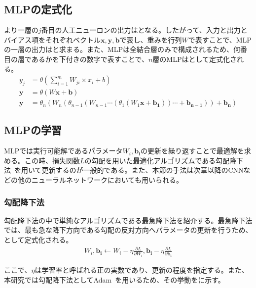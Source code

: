 \subsection{MLPの定式化}

より一層の$j$番目の人工ニューロンの出力はとなる。したがって、入力と出力とバイアス項をそれぞれベクトル$\boldsymbol{x},\boldsymbol{y},\boldsymbol{b}$で表し、重みを行列$W$で表すことで、MLPの一層の出力はと求まる。また、MLPは全結合層のみで構成されるため、何番目の層であるかを下付きの数字で表すことで、$n$層のMLPはとして定式化される。
\begin{align}
    \label{eq:MLP0_1}
    y_j&=\theta(\sum_{i=1}^{m} W_{ji} \times x_i+b)\\
    \label{eq:MLP0_2}
    \boldsymbol{y}&=\theta(W\boldsymbol{x}+\boldsymbol{b})\\[8pt]
    \label{eq:MLP0_3}
    \boldsymbol{y}&=\theta_{n}(W_{n}(\theta_{n-1}(W_{n-1}\cdots(\theta_{1}(W_{1}\boldsymbol{x}+\boldsymbol{b_{1}}))\cdots+\boldsymbol{b_{n-1}}))+\boldsymbol{b_{n}})
\end{align}

\subsection{MLPの学習}

MLPでは実行可能解であるパラメータ$W_i,\boldsymbol{b_i}$の更新を繰り返すことで最適解を求める。この時、損失関数$L$の勾配を用いた最適化アルゴリズムである勾配降下法~\cite{GradientDescent}を用いて更新するのが一般的である。また、本節の手法は次章以降のCNNなどの他のニューラルネットワークにおいても用いられる。

\subsubsection{勾配降下法}
\label{sec:grad}

勾配降下法の中で単純なアルゴリズムである最急降下法を紹介する。最急降下法では、最も急な降下方向である勾配の反対方向へパラメータの更新を行うため、として定式化される。
\begin{align}
    \label{eq:MLP2_0}
    W _i , \boldsymbol{b _i} \leftarrow W_i - \eta \frac{\partial L}{\partial W_i} , \boldsymbol{b_i} - \eta \frac{\partial L}{\partial \boldsymbol{b_i}}
\end{align}

ここで、$\eta$は学習率と呼ばれる正の実数であり、更新の程度を指定する。また、本研究では勾配降下法としてAdam~\cite{Adam}を用いるため、その挙動をに示す。


